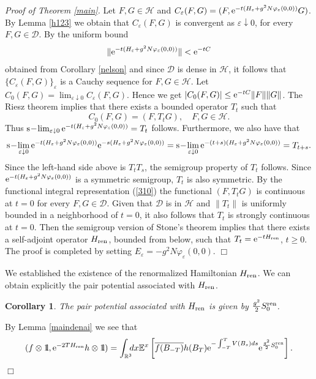 \documentclass[11pt]{article}
\newtheorem{corollary}[theorem]{Corollary}
\providecommand{\bc}[1]{\begin{corollary}\label{#1}}
\providecommand{\ec}{\end{corollary}}
\def\bbbone{{\mathchoice {\rm 1\mskip-4mu l} {\rm 1\mskip-4mu l}
{\rm 1\mskip-4.5mu l} {\rm 1\mskip-5mu l}}}
\def\one{\bbbone}
\providecommand{\idx}{\int_{\BR} \!\!\! dx}
\newcommand{\Ebb}{{\mathbb E}}
\providecommand{\eq}[1]{\begin{equation}\label{#1}}
\providecommand{\en}{\end{equation}}
\providecommand{\qed}{\hfill {$\Box$}\par\medskip}
\providecommand{\BR}{{\mathbb{R}^3 }}
\providecommand{\kak}[1]{(\ref{#1})}
\providecommand{\hni}{\hn_\ren }
\providecommand{\D}{{\ms D}}
\providecommand{\hn}{H}%
\providecommand{\ms}[1]{\mathscr{#1}}
\providecommand{\ov}[1]{\overline{#1}}
\providecommand{\hhh}{\ms H} %
\providecommand{\slim}{{\rm s}\!-\!\lim}
\providecommand{\e}{{\rm e}}
\providecommand{\1}{\mathbb{1}}
\providecommand {\D}  {\ensuremath {\mathcal{D}}}
\providecommand{\eps}{\varepsilon}
\providecommand{\ren}{{\rm ren}}
\begin{document}
\medskip
\noindent
\emph{Proof of Theorem \ref{main}.}
Let $F, G\in \hhh$ and $C_\eps(F,G)=(F, \e^{-t(H_\eps+g^2N\varphi_\eps(0,0))}G)$. By Lemma \ref{h123} we
obtain that $C_\eps(F,G)$ is convergent as $\eps\downarrow0$, for every $F,G\in\D$. By the uniform bound
$$
\|\e^{-t(H_\eps+g^2N\varphi_\eps(0,0))}\|<\e^{-tC}
$$
obtained from Corollary  \ref{nelson} and since $\D$ is dense in $\hhh$, it follows that
$\{C_\eps(F,G)\}_\eps$ is a Cauchy sequence for $F,G\in\hhh$. Let $C_0(F,G)=\lim_{\eps\downarrow 0}C_\eps(F,G)$.
Hence we get $|C_0(F,G)|\leq \e^{-tC}\|F\|\|G\|$. The Riesz theorem implies that there exists a bounded operator
$T_t$ such that
$$
C_0(F,G)=(F, T_t G),\quad F,G\in \hhh.
$$
Thus $\slim_{\eps\downarrow 0}\e^{-t(\hn_\eps+g^2N\varphi_\eps(0,0))}=T_t$ follows. Furthermore, we also have
that
$$
\slim_{\eps\downarrow 0} \e^{-t(\hn_\eps+g^2N\varphi_\eps(0,0))}
\e^{-s(\hn_\eps+g^2N\varphi_\eps(0,0))}=\slim_{\eps\downarrow 0}
\e^{-(t+s)(\hn_\eps+g^2N\varphi_\eps(0,0))}=T_{t+s}.
$$
Since the left-hand side above is $T_t T_s$, the semigroup property of $T_t$ follows. Since
$\e^{-t(\hn_\eps+g^2N\varphi_\eps(0,0))}$ is a symmetric semigroup, $T_t$ is also symmetric. By
the functional integral representation \kak{310} the functional $(F, T_t G)$ is continuous at $t=0$
for every $F, G \in \D$. Given that $\D$ is in $\hhh$ and $\|T_t\|$ is uniformly bounded in a
neighborhood of  $t=0$, it also follows that  $T_t$ is strongly continuous at $t=0$. Then the
semigroup version of Stone's theorem \cite[Proposition 3.26]{lhb11} implies that there exists a
self-adjoint operator $\hni$, bounded from below, such that
$T_t=\e^{-t\hni}$, $t\geq0$.  The proof is
completed by setting $E_\eps=-g^2N\varphi_\eps(0,0)$.
\qed
We established the existence of the renormalized Hamiltonian $H_\ren$. We can obtain explicitly
the pair potential associated with $H_\ren$.
\bc{pair potential}
The pair potential associated with $\hni$ is given by $\frac{g^2}{2}S_0^\ren $.
\ec
\proof
By Lemma \ref{maindenai} we see that
\eq{sasa212}
(f\otimes \one, \e^{-2T\hni} h\otimes \one)
=\idx  \Ebb^x \left[\ov{f(B_{-T})} h(B_T)\e^{-\int_{-T}^T V(B_s) ds} \e^{\frac{g^2}{2} S_0^\ren}
\right].
\en
\qed
\end{document}
